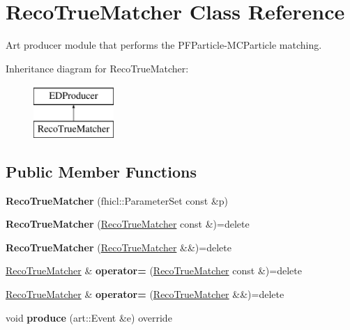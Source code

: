 \hypertarget{classRecoTrueMatcher}{\section{Reco\-True\-Matcher Class Reference}
\label{classRecoTrueMatcher}
}


Art producer module that performs the P\-F\-Particle-\/\-M\-C\-Particle matching.  


Inheritance diagram for Reco\-True\-Matcher\-:\begin{figure}[H]
\begin{center}
\leavevmode
\includegraphics[height=2.000000cm]{classRecoTrueMatcher}
\end{center}
\end{figure}
\subsection*{Public Member Functions}
\begin{DoxyCompactItemize}
\item 
\hypertarget{classRecoTrueMatcher_a85eaff8fb078f81ef1ecd449ff41d694}{{\bfseries Reco\-True\-Matcher} (fhicl\-::\-Parameter\-Set const \&p)}\label{classRecoTrueMatcher_a85eaff8fb078f81ef1ecd449ff41d694}

\item 
\hypertarget{classRecoTrueMatcher_a0bd60551a7f6f542a05cdc9e83242f82}{{\bfseries Reco\-True\-Matcher} (\hyperlink{classRecoTrueMatcher}{Reco\-True\-Matcher} const \&)=delete}\label{classRecoTrueMatcher_a0bd60551a7f6f542a05cdc9e83242f82}

\item 
\hypertarget{classRecoTrueMatcher_ad71b69cce4a1a8352775223e82bc6a33}{{\bfseries Reco\-True\-Matcher} (\hyperlink{classRecoTrueMatcher}{Reco\-True\-Matcher} \&\&)=delete}\label{classRecoTrueMatcher_ad71b69cce4a1a8352775223e82bc6a33}

\item 
\hypertarget{classRecoTrueMatcher_ac3407a49992189857c73eeb46a0206af}{\hyperlink{classRecoTrueMatcher}{Reco\-True\-Matcher} \& {\bfseries operator=} (\hyperlink{classRecoTrueMatcher}{Reco\-True\-Matcher} const \&)=delete}\label{classRecoTrueMatcher_ac3407a49992189857c73eeb46a0206af}

\item 
\hypertarget{classRecoTrueMatcher_acc9f666bb0ec8acb2f1e7fef043d0151}{\hyperlink{classRecoTrueMatcher}{Reco\-True\-Matcher} \& {\bfseries operator=} (\hyperlink{classRecoTrueMatcher}{Reco\-True\-Matcher} \&\&)=delete}\label{classRecoTrueMatcher_acc9f666bb0ec8acb2f1e7fef043d0151}

\item 
\hypertarget{classRecoTrueMatcher_a9c4e732a8dba26adf726235777c2a441}{void {\bfseries produce} (art\-::\-Event \&e) override}\label{classRecoTrueMatcher_a9c4e732a8dba26adf726235777c2a441}

\end{DoxyCompactItemize}


